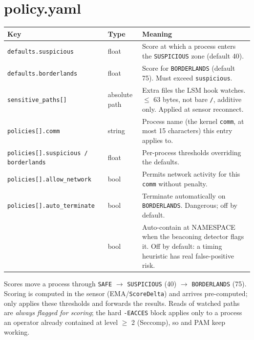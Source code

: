 \section{policy.yaml}
\begin{center}\small
\begin{tabularx}{\textwidth}{@{}L{4.2cm}L{2.2cm}Y@{}}
\toprule
\textbf{Key} & \textbf{Type} & \textbf{Meaning}\\
\midrule
\texttt{defaults.suspicious} & float & Score at which a process enters the \texttt{SUSPICIOUS} zone (default 40).\\
\texttt{defaults.borderlands} & float & Score for \texttt{BORDERLANDS} (default 75). Must exceed \texttt{suspicious}.\\
\texttt{sensitive\_paths[]} & absolute path & Extra files the LSM hook watches. $\le$ 63 bytes, not bare \texttt{/}, additive only. Applied at sensor reconnect.\\
\texttt{policies[].comm} & string & Process name (the kernel \texttt{comm}, at most 15 characters) this entry applies to.\\
\texttt{policies[].suspicious / borderlands} & float & Per-process thresholds overriding the defaults.\\
\texttt{policies[].allow\_network} & bool & Permits network activity for this \texttt{comm} without penalty.\\
\texttt{policies[].auto\_terminate} & bool & Terminate automatically on \texttt{BORDERLANDS}. Dangerous; off by default.\\
 & bool & Auto-contain at NAMESPACE when the beaconing detector flags it. Off by default: a timing heuristic has real false-positive risk.\\
\bottomrule
\end{tabularx}
\end{center}
\begin{kbnote}
Scores move a process through \texttt{SAFE} $\to$ \texttt{SUSPICIOUS} (40) $\to$ \texttt{BORDERLANDS} (75). Scoring is
computed in the sensor (EMA/\texttt{ScoreDelta}) and arrives pre-computed;  only applies these
thresholds and forwards the results. Reads of watched paths are \emph{always flagged for scoring}; the
hard \texttt{-EACCES} block applies only to a process an operator already contained at level $\ge$ 2 (Seccomp),
so  and PAM keep working.
\end{kbnote}

